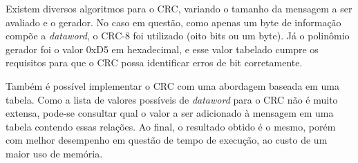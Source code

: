 Existem diversos algoritmos para o CRC, variando o tamanho da mensagem a ser avaliado e o gerador. No caso em questão, como apenas um byte de informação compõe a \textit{dataword}, o CRC-8 foi utilizado (oito bits ou um byte). Já o polinômio gerador foi o valor 0xD5 em hexadecimal, e esse valor tabelado cumpre os requisitos para que o CRC possa identificar erros de bit corretamente.

Também é possível implementar o CRC com uma abordagem baseada em uma tabela. Como a lista de valores possíveis de \textit{dataword} para o CRC não é muito extensa, pode-se consultar qual o valor a ser adicionado à mensagem em uma tabela contendo essas relações. Ao final, o resultado obtido é o mesmo, porém com melhor desempenho em questão de tempo de execução, ao custo de um maior uso de memória.

